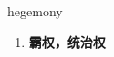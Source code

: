 
\begin{frame}
{\huge hegemony}
\begin{center}
\begin{enumerate}\Large
  \item \textbf{霸权，统治权}
\end{enumerate}
\end{center}
\end{frame}

